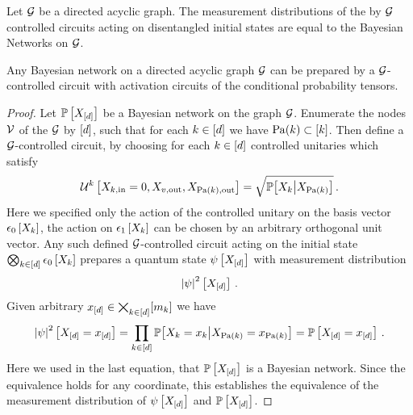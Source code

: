 \begin{theorem}\label{the:graphControlledPreparesBN}
    Let $\mathcal{G}$ be a directed acyclic graph.
    The measurement distributions of the by $\mathcal{G}$ controlled circuits acting on disentangled initial states are equal to the Bayesian Networks on $\mathcal{G}$.
\end{theorem}

\begin{lemma}
    Any Bayesian network on a directed acyclic graph $\mathcal{G}$ can be prepared by a $\mathcal{G}$-controlled circuit with activation circuits of the conditional probability tensors.
\end{lemma}
\begin{proof}
    Let $\mathbb{P}\left[X_{[d]}\right]$ be a Bayesian network on the graph $\mathcal{G}$.
    Enumerate the nodes $\mathcal{V}$ of the $\mathcal{G}$ by $[d]$, such that for each $k\in[d]$ we have $\mathrm{Pa}(k)\subset[k]$.
    Then define a $\mathcal{G}$-controlled circuit, by choosing for each $k\in[d]$ controlled unitaries which satisfy
    \begin{align*}
        \mathcal{U}^{k}\left[X_{k,\mathrm{in}}=0,X_{v,\mathrm{out}},X_{\mathrm{Pa}(k),\mathrm{out}}\right]
        =\sqrt{\mathbb{P}\big[X_{k}\big|X_{\mathrm{Pa}(k)}\big]} \, .
    \end{align*}
    Here we specified only the action of the controlled unitary on the basis vector $\epsilon_{0}\left[X_{k}\right]$, the action on $\epsilon_{1}\left[X_{k}\right]$ can be chosen by an arbitrary orthogonal unit vector. %
    Any such defined $\mathcal{G}$-controlled circuit acting on the initial state $\bigotimes_{k\in[d]}\epsilon_{0}\left[X_{k}\right]$ prepares a quantum state $\psi\left[X_{[d]}\right]$ with measurement distribution
    \begin{align*}
        \left|\psi\right|^2\left[X_{[d]}\right] \, .
    \end{align*}
    Given arbitrary $x_{[d]}\in\bigtimes_{k\in[d]}[m_{k}]$ we have
        \begin{align*}
        \left|\psi\right|^2\left[X_{[d]}=x_{[d]}\right]
            = \prod_{k\in[d]} \mathbb{P}\big[X_{k}=x_{k}\big|X_{\mathrm{Pa}(k)}=x_{\mathrm{Pa}(k)}\big]
            = \mathbb{P}\left[X_{[d]}=x_{[d]}\right] \, .
    \end{align*}
    Here we used in the last equation, that $\mathbb{P}\left[X_{[d]}\right]$ is a Bayesian network.
    Since the equivalence holds for any coordinate, this establishes the equivalence of the measurement distribution of $\psi\left[X_{[d]}\right]$ and $\mathbb{P}\left[X_{[d]}\right]$.
\end{proof}


